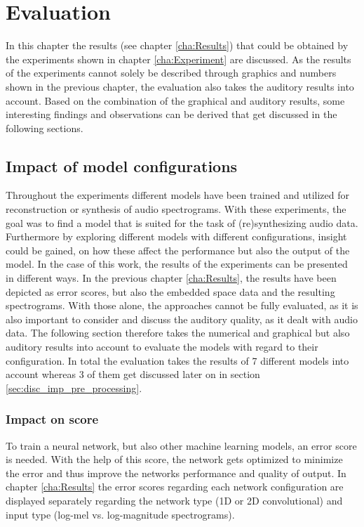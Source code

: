 \chapter{Evaluation}
\label{cha:Discussion}

In this chapter the results (see chapter \ref{cha:Results}) that could be obtained by the experiments shown in chapter \ref{cha:Experiment} are discussed. As the results of the experiments cannot solely be described through graphics and numbers shown in the previous chapter, the evaluation also takes the auditory results into account. Based on the combination of the graphical and auditory results, some interesting findings and observations can be derived that get discussed in the following sections.


\section{Impact of model configurations}
\label{sec:disc_model_conf}
Throughout the experiments different models have been trained and utilized for reconstruction or synthesis of audio spectrograms. With these experiments, the goal was to find a model that is suited for the task of (re)synthesizing audio data. Furthermore by exploring different models with different configurations, insight could be gained, on how these affect the performance but also the output of the model. In the case of this work, the results of the experiments can be presented in different ways. In the previous chapter \ref{cha:Results}, the results have been depicted as error scores, but also the embedded space data and the resulting spectrograms. With those alone, the approaches cannot be fully evaluated, as it is also important to consider and discuss the auditory quality, as it dealt with audio data. The following section therefore takes the numerical and graphical but also auditory results into account to evaluate the models with regard to their configuration. In total the evaluation takes the results of 7 different models into account whereas 3 of them get discussed later on in section \ref{sec:disc_imp_pre_processing}.

\subsection{Impact on score}
\label{subsec:disc_conf_score}
To train a neural network, but also other machine learning models, an error score is needed. With the help of this score, the network gets optimized to minimize the error and thus improve the networks performance and quality of output. In chapter \ref{cha:Results} the error scores regarding each network configuration are displayed separately regarding the network type (1D or 2D convolutional) and input type (log-mel vs. log-magnitude spectrograms).

